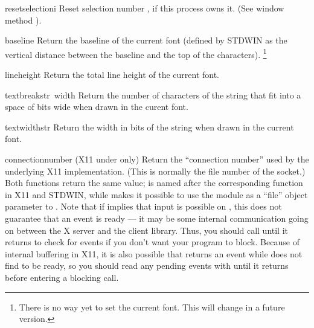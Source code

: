 \begin{funcdesc}{resetselection}{i}
Reset selection number
,
if this process owns it.
(See window method
).
\end{funcdesc}

\begin{funcdesc}{baseline}{}
Return the baseline of the current font (defined by STDWIN as the
vertical distance between the baseline and the top of the
characters).%
\footnote{There is no way yet to set the current font.
	This will change in a future version.}
\end{funcdesc}

\begin{funcdesc}{lineheight}{}
Return the total line height of the current font.
\end{funcdesc}

\begin{funcdesc}{textbreak}{str\, width}
Return the number of characters of the string that fit into a space of
bits wide when drawn in the curent font.
\end{funcdesc}

\begin{funcdesc}{textwidth}{str}
Return the width in bits of the string when drawn in the current font.
\end{funcdesc}

\begin{funcdesc}{connectionnumber}{}
(X11 under \UNIX{} only) Return the ``connection number'' used by the
underlying X11 implementation.  (This is normally the file number of
the socket.)  Both functions return the same value;
 is named after the corresponding function in
X11 and STDWIN, while  makes it possible to use the
 module as a ``file'' object parameter to
.  Note that if  implies that
input is possible on , this does not guarantee that an
event is ready --- it may be some internal communication going on
between the X server and the client library.  Thus, you should call
 until it returns  to check for
events if you don't want your program to block.  Because of internal
buffering in X11, it is also possible that 
returns an event while  does not find  to
be ready, so you should read any pending events with
 until it returns  before entering
a blocking  call.
\end{funcdesc}

